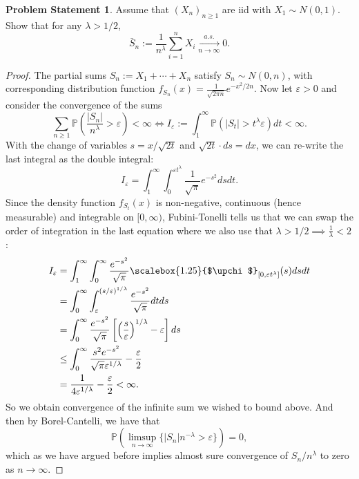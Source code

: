 \documentclass[12pt,reqno]{article}
\theoremstyle{plain}
\theoremstyle{definition}
\newtheorem{problem}[theorem]{Problem Statement}
\newcommand{\PP}[1]{\ensuremath{\mathbb{P}\left(#1\right)}}
\renewcommand{\chi}{\scalebox{1.25}{$\upchi$}}
\begin{document}
\begin{problem}
Assume that $(X_n)_{n \geq 1}$ are iid with $X_1 \sim N(0, 1)$. Show that 
for any $\lambda > 1/2$, 
\[
\bar{S}_n := 
     \frac{1}{n^{\lambda}} \sum_{i=1}^n X_i 
     \xrightarrow[n \rightarrow \infty]{a.s.} 0. 
\]
\end{problem} 
\begin{proof} 
The partial sums $S_n := X_1+\cdots+X_n$ satisfy $S_n \sim N(0, n)$, with 
corresponding distribution function 
$f_{S_n}(x) = \frac{1}{\sqrt{2\pi n}} e^{-x^2 / 2n}$. Now let 
$\varepsilon > 0$ and consider the convergence of the sums 
\[
\sum_{n \geq 1} \PP{\frac{|S_n|}{n^{\lambda}} > \varepsilon} < \infty 
     \iff I_{\varepsilon} := 
     \int_1^{\infty} \PP{|S_t| > t^{\lambda} \varepsilon} dt < \infty. 
\]
With the change of variables $s = x / \sqrt{2t}$ and 
$\sqrt{2t} \cdot ds = dx$, we can re-write the last integral as the 
double integral:
\[
I_{\varepsilon} = \int_1^{\infty} \int_0^{\varepsilon t^{\lambda}} 
     \frac{1}{\sqrt{\pi}} e^{-s^2} ds dt. 
\]
Since the density function $f_{S_t}(x)$ is non-negative, continuous (hence 
measurable) and integrable on $[0, \infty)$, Fubini-Tonelli tells us that 
we can swap the order of integration in the last equation where we also 
use that $\lambda > 1/2 \implies \frac{1}{\lambda} < 2$:
\begin{align*} 
I_{\varepsilon} & = \int_1^{\infty} \int_0^{\infty} 
     \frac{e^{-s^2}}{\sqrt{\pi}} \chi_{[0,\varepsilon t^{\lambda}]}(s) 
     ds dt \\ 
     & = \int_0^{\infty} \int_{\varepsilon}^{(s / \varepsilon)^{1/\lambda}} 
     \frac{e^{-s^2}}{\sqrt{\pi}} dt ds \\ 
     & = \int_0^{\infty} \frac{e^{-s^2}}{\sqrt{\pi}} \left[ 
     \left(\frac{s}{\varepsilon}\right)^{1/\lambda} - 
     \varepsilon\right] ds \\ 
     & \leq \int_0^{\infty} \frac{s^2 e^{-s^2}}{\sqrt{\pi} 
     \varepsilon^{1/\lambda}} - \frac{\varepsilon}{2} \\ 
     & = \frac{1}{4 \varepsilon^{1/\lambda}} - \frac{\varepsilon}{2} < 
     \infty. 
\end{align*} 
So we obtain convergence of the infinite sum we wished to bound above. And 
then by Borel-Cantelli, we have that 
\[
\PP{\limsup_{n \rightarrow \infty} \{|S_n| n^{-\lambda} > \varepsilon\}} = 0, 
\]
which as we have argued before implies almost sure convergence of 
$S_n / n^{\lambda}$ to zero as $n \rightarrow \infty$. 
\end{proof} 
\end{document}
